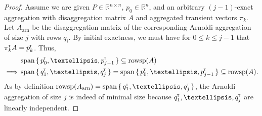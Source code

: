 \documentclass[10pt,a4paper]{amsart}
\newcommand*{\bbR}{\mathbb{R}}
\DeclareMathOperator{\rowsp}{rowsp}
\DeclareMathOperator{\spn}{span}
\newcommand*{\transp}{^{\mkern-1.5mu{\scriptscriptstyle\mathsf{T}}}}
\begin{document}
\begin{proof}
    Assume we are given $P \in \bbR^{n \times n}$, $p_0 \in \bbR^n$, and an arbitrary $(j - 1)$-exact aggregation with disaggregation matrix $A$ and aggregated transient vectors $\pi_k$.
    Let $A_{\mathrm{arn}}$ be the disaggregation matrix of the corresponding Arnoldi aggregation of size $j$ with rows $q_i$.
    By initial exactness, we must have for $0 \leq k \leq j - 1$ that $\pi_k\transp A = p_k\transp$.
    Thus,
    \begin{align*}
        & \spn \set{p_0\transp, \dots, p_{j - 1}\transp} \subseteq \rowsp(A)\\
        \implies & \spn \set{q_1\transp, \dots, q_j\transp} = \spn \set{p_0\transp, \dots, p_{j - 1}\transp} \subseteq \rowsp(A).
    \end{align*}
    As by definition $\rowsp(A_\mathrm{arn}) = \spn \set{q_1\transp, \dots, q_j\transp}$, the Arnoldi aggregation of size $j$ is indeed of minimal size because $q_1\transp, \dots, q_j\transp$ are linearly independent.
\end{proof}
\end{document}
